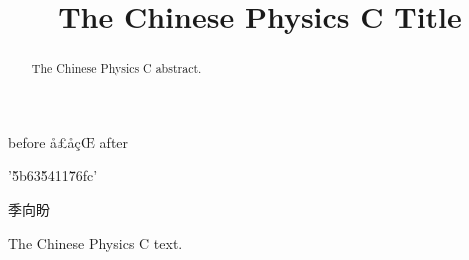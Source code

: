 \documentclass[a4paper,10pt,twoside]{cpc-hepnp}
\begin{document}
 \title{The Chinese Physics C Title}
before
å­£åçŒ
after

'\u5b63\u5411\u76fc'

季向盼


  \begin{abstract}
The Chinese Physics C abstract.
  \end{abstract}


The Chinese Physics C text.
\end{document}
